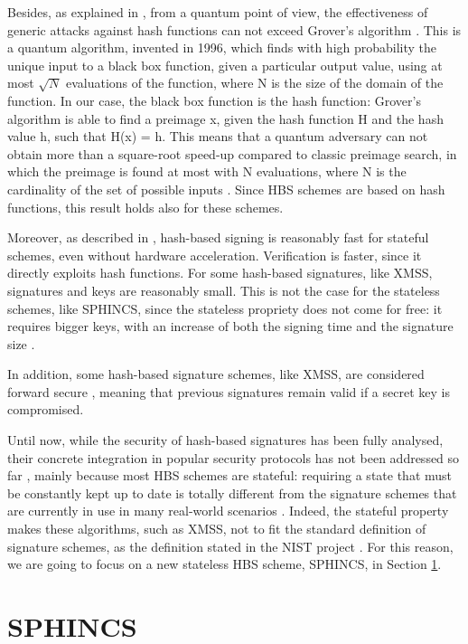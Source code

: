 \documentclass[a4paper,12pt]{article}
\begin{document}
Besides, as explained in \cite{12_faultinjection}, from a quantum point of view, the effectiveness of generic attacks against hash functions can not exceed Grover's algorithm \cite{36_Grover}.
This is a quantum algorithm, invented in 1996, which finds with high probability the unique input to a black box function, given a particular output value, using at most $\sqrt{N}$ evaluations of the function, where N is the size of the domain of the function. 
In our case, the black box function is the hash function: Grover's algorithm is able to find a preimage x, given the hash function H and the hash value h, such that H(x) = h.
This means that a quantum adversary can not obtain more than a square-root speed-up compared to classic preimage search, in which the preimage is found at most with N evaluations, where N is the cardinality of the set of possible inputs \cite{12_faultinjection}. Since HBS schemes are based on hash functions, this result holds also for these schemes. 

Moreover, as described in \cite{1_sphincspaper}, hash-based signing is reasonably fast for stateful schemes, even without hardware acceleration. Verification is faster, since it directly exploits hash functions. For some hash-based signatures, like XMSS, signatures and keys are reasonably small.
This is not the case for the stateless schemes, like SPHINCS, since the stateless propriety does not come for free: it requires bigger keys, with an increase of both the signing time and the signature size \cite{8_ARM}. 

In addition, some hash-based signature schemes, like XMSS, are considered forward secure \cite{32_XMSS}, meaning that previous signatures remain valid if a secret key is compromised.

Until now, while the security of hash-based signatures has been fully analysed, their concrete integration in popular security protocols has not been addressed so far \cite{9_postquantum_auth_openssl}, mainly because most HBS schemes are stateful: requiring a state that must be constantly kept up to date is totally different from the signature schemes that are currently in use in many real-world scenarios \cite{8_ARM}. Indeed, the stateful property makes these algorithms, such as XMSS, not to fit the standard definition of signature schemes, as the definition stated in the NIST project \cite{2_SPHINCS+_round2}.
For this reason, we are going to focus on a new stateless HBS scheme, SPHINCS, in Section \ref{sec:sphincs}.

\section{SPHINCS}
\label{sec:sphincs}
\end{document}
